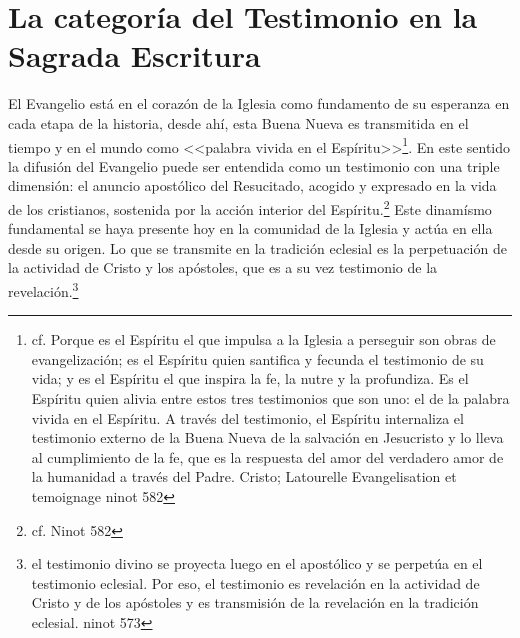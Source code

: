 \section{La categoría del Testimonio en la Sagrada Escritura}
El Evangelio está en el corazón de la Iglesia como fundamento de su esperanza en
cada etapa de la historia, desde ahí, esta Buena Nueva es transmitida en el
tiempo y en el mundo como <<palabra vivida en el Espíritu>>\footnote{cf. Porque
  es el Espíritu el que impulsa a la Iglesia a perseguir son obras de
  evangelización; es el Espíritu quien santifica y fecunda el testimonio de su
  vida; y es el Espíritu el que inspira la fe, la nutre y la profundiza. Es el
  Espíritu quien alivia entre estos tres testimonios que son uno: el de la
  palabra vivida en el Espíritu. A través del testimonio, el Espíritu
  internaliza el testimonio externo de la Buena Nueva de la salvación en
  Jesucristo y lo lleva al cumplimiento de la fe, que es la respuesta del amor
  del verdadero amor de la humanidad a través del Padre. Cristo; Latourelle
  Evangelisation et temoignage ninot 582}. En este sentido la difusión del
Evangelio puede ser entendida como un testimonio con una triple dimensión: el
anuncio apostólico del Resucitado, acogido y expresado en la vida de los
cristianos, sostenida por la acción interior del Espíritu.\footnote{cf. Ninot
  582} Este dinamísmo fundamental se haya presente hoy en la comunidad de la
Iglesia y actúa en ella desde su origen. Lo que se transmite en la tradición
eclesial es la perpetuación de la actividad de Cristo y los apóstoles, que es a
su vez testimonio de la revelación.\footnote{ el testimonio divino se proyecta
  luego en el apostólico y se perpetúa en el testimonio eclesial. Por eso, el
  testimonio es revelación en la actividad de Cristo y de los apóstoles y es
  transmisión de la revelación en la tradición eclesial. ninot 573}

